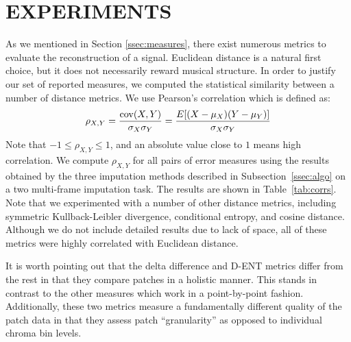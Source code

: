 \documentclass{article}
\begin{document}
\section{EXPERIMENTS}
\label{sec:exp}
As we mentioned in Section \ref{ssec:measures}, there exist numerous
metrics to evaluate the reconstruction of a signal. Euclidean distance
is a natural first choice, but it does not necessarily reward musical
structure. In order to justify our set of reported measures, we
computed the statistical similarity between a number of distance
metrics.  We use Pearson's correlation which is defined as:
$$
\rho_{X,Y}={\mathrm{cov}(X,Y) \over \sigma_X
    \sigma_Y} ={E[(X-\mu_X)(Y-\mu_Y)] \over \sigma_X\sigma_Y}
$$
Note that $-1 \leq \rho_{X,Y} \leq 1$, and an absolute value close to
$1$ means high correlation. We compute $\rho_{X,Y}$ for all pairs of error
measures using the results obtained by the three imputation methods 
described in Subsection~\ref{ssec:algo} on a two multi-frame
imputation task.  The results are shown in Table~\ref{tab:corrs}.
Note that we experimented with a number of other distance metrics,
including symmetric Kullback-Leibler divergence, conditional entropy,
and cosine distance.  Although we do not include detailed results due
to lack of space, all of these metrics were highly correlated with
Euclidean distance.  

It is worth pointing out that the delta difference and D-ENT metrics
differ from the rest in that they compare patches in a holistic
manner.  This stands in contrast to the other measures which work in a
point-by-point fashion.  Additionally, these two metrics measure a
fundamentally different quality of the patch data in that they assess
patch ``granularity'' as opposed to individual chroma bin levels.

\end{document}
